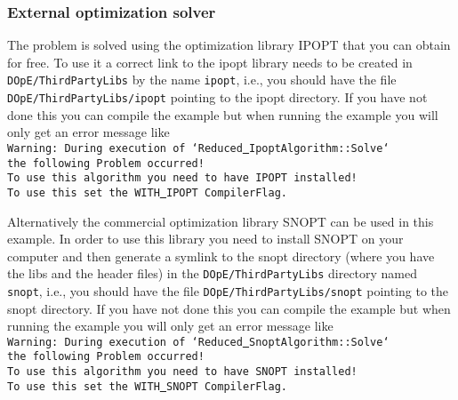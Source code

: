 \subsubsection{External optimization solver}
The problem is solved using the optimization library IPOPT that you can obtain for free. To use it 
a correct link to the ipopt library needs to be created in  {\tt DOpE/ThirdPartyLibs} by the name 
{\tt ipopt}, i.e., you should have the file
{\tt DOpE/ThirdPartyLibs/ipopt} pointing to the ipopt directory. If you have not done this you can compile the
example but when running the example you will only get an error message like\\
{\tt Warning: During execution of `Reduced\underline{ }IpoptAlgorithm::Solve`\\ the following Problem occurred!\\
To use this algorithm you need to have IPOPT installed! \\To use this set the WITH\underline{ }IPOPT CompilerFlag.}

Alternatively the commercial optimization library SNOPT can be used in this example.
In order to use this library you need to install SNOPT on your computer and then generate a symlink to 
the snopt directory (where you have the libs and the header files) 
in the {\tt DOpE/ThirdPartyLibs} directory named {\tt snopt}, i.e., you should have the file
{\tt DOpE/ThirdPartyLibs/snopt} pointing to the snopt directory. If you have not done this you can compile the
example but when running the example you will only get an error message like\\
{\tt Warning: During execution of `Reduced\underline{ }SnoptAlgorithm::Solve`\\ the following Problem occurred!\\
To use this algorithm you need to have SNOPT installed! \\To use this set the WITH\underline{ }SNOPT CompilerFlag.} 
